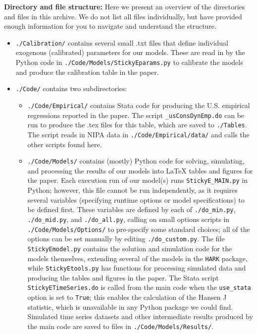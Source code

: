 \documentclass[12pt,pdftex,letterpaper]{article}
\begin{document}
\noindent \textbf{Directory and file structure:} Here we present an overview of the directories and files in this archive.  We do not list all files individually, but have provided enough information for you to navigate and understand the structure.
\begin{itemize}

\item \texttt{./Calibration/} contains several small .txt files that define individual exogenous (calibrated) parameters for our models.  These are read in by the Python code in \texttt{./Code/Models/StickyEparams.py} to calibrate the models and produce the calibration table in the paper.

\item \texttt{./Code/} contains two subdirectories:

\begin{itemize}

\item \texttt{./Code/Empirical/} contains Stata code for producing the U.S. empirical regressions reported in the paper.  The script \texttt{\_usConsDynEmp.do} can be run to produce the .tex files for this table, which are saved to \texttt{./Tables}.  The script reads in NIPA data in \texttt{./Code/Empirical/data/} and calls the other scripts found here.

\item \texttt{./Code/Models/} contains (mostly) Python code for solving, simulating, and processing the results of our models into LaTeX tables and figures for the paper.  Each execution run of our model(s) runs \texttt{StickyE\_MAIN.py} in Python; however, this file cannot be run independently, as it requires several variables (specifying runtime options or model specifications) to be defined first.  These variables are defined by each of \texttt{./do\_min.py}, \texttt{./do\_mid.py}, and \texttt{./do\_all.py}, calling on small options scripts in \texttt{./Code/Models/Options/} to pre-specify some standard choices; all of the options can be set manually by editing \texttt{./do\_custom.py}.  The file \texttt{StickyEmodel.py} contains the solution and simulation code for the models themselves, extending several of the models in the \texttt{HARK} package, while \texttt{StickyEtools.py} has functions for processing simulated data and producing the tables and figures in the paper.  The Stata script \texttt{StickyETimeSeries.do} is called from the main code when the \texttt{use\_stata} option is set to \texttt{True}; this enables the calculation of the Hansen J statistic, which is unavailable in any Python package we could find.  Simulated time series datasets and other intermediate results produced by the main code are saved to files in \texttt{./Code/Models/Results/}.


\end{itemize}
\end{itemize}
\end{document}
